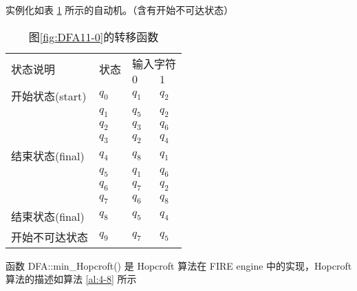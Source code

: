 实例化如表 \ref{tab:DFA411-1} 所示的自动机。（含有开始不可达状态）

\begin{table}[!htbp]
    \caption{图\ref{fig:DFA11-0}的转移函数}
    \label{tab:DFA411-1}
    \centering
    \small%
    \setlength{\tabcolsep}{4pt}%
    \renewcommand{\arraystretch}{1.2}%
        \begin{tabular}{l p{4em}<{\centering} p{3em}<{\centering} p{3em}<{\centering}}
        \toprule %
        \multirow{2}{*}{状态说明} & \multirow{2}{*}{状态} & \multicolumn{2}{c}{输入字符} \\
		\cline{3-4}      &    &$0$ & $1$  \\
        \midrule%
        开始状态(start)  & $q_0$ & $q_1$   & $q_2$   \\
                        & $q_1$ & $q_5$   & $q_2$   \\
                        & $q_2$ & $q_3$   & $q_6$   \\
                        & $q_3$ & $q_2$   & $q_4$   \\
        结束状态(final) & $q_4$ & $q_8$   & $q_1$   \\
                        & $q_5$ & $q_1$   & $q_6$   \\
                        & $q_6$ & $q_7$   & $q_2$   \\
                        & $q_7$ & $q_6$   & $q_8$   \\
        结束状态(final) & $q_8$ & $q_5$   & $q_4$   \\
        开始不可达状态    & $q_9$ & $q_7$   & $q_5$   \\
        \bottomrule%
    \end{tabular}
\end{table}

函数 DFA::min\_Hopcroft() 是 Hopcroft 算法在 FIRE engine 中的实现，Hopcroft 算法的描述如算法 \ref{al:4-8} 所示\cite{watson1993taxonomyb}


